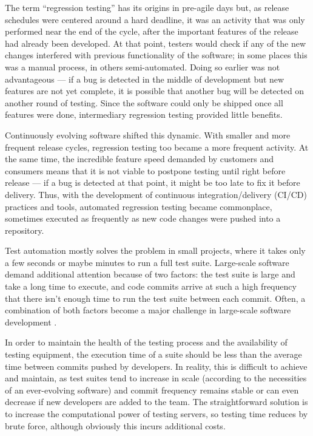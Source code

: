 The term ``regression testing'' has its origins in pre-agile days but, as release schedules were centered around a hard deadline, it was an activity that was only performed near the end of the cycle, after the important features of the release had already been developed.
At that point, testers would check if any of the new changes interfered with previous functionality of the software; in some places this was a manual process, in others semi-automated.
Doing so earlier was not advantageous — if a bug is detected in the middle of development but new features are not yet complete, it is possible that another bug will be detected on another round of testing.
Since the software could only be shipped once all features were done, intermediary regression testing provided little benefits.

Continuously evolving software shifted this dynamic.
With smaller and more frequent release cycles, regression testing too became a more frequent activity.
At the same time, the incredible feature speed demanded by customers and consumers means that it is not viable to postpone testing until right before release — if a bug is detected at that point, it might be too late to fix it before delivery.
Thus, with the development of continuous integration/delivery (CI/CD) practices and tools, automated regression testing became commonplace, sometimes executed as frequently as new code changes were pushed into a repository.

Test automation mostly solves the problem in small projects, where it takes only a few seconds or maybe minutes to run a full test suite.
Large-scale software demand additional attention because of two factors: the test suite is large and take a long time to execute, and code commits arrive at such a high frequency that there isn't enough time to run the test suite between each commit.
Often, a combination of both factors become a major challenge in large-scale software development \cite{memon_taming_2017}.

In order to maintain the health of the testing process and the availability of testing equipment, the execution time of a suite should be less than the average time between commits pushed by developers.
In reality, this is difficult to achieve and maintain, as test suites tend to increase in scale (according to the necessities of an ever-evolving software) and commit frequency remains stable or can even decrease if new developers are added to the team.
The straightforward solution is to increase the computational power of testing servers, so testing time reduces by brute force, although obviously this incurs additional costs.

